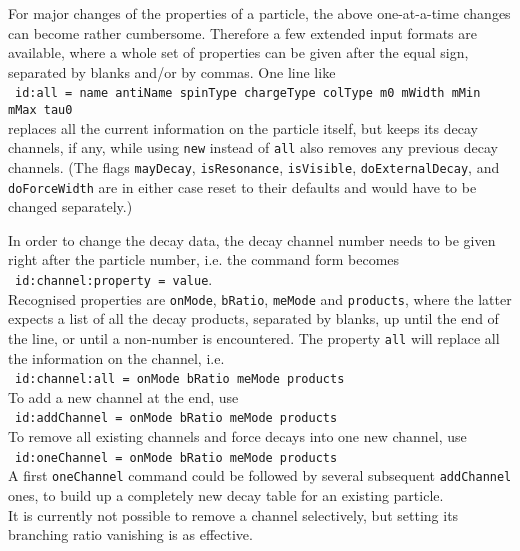 \documentclass{elsartmod}
\newcommand{\cindent}{\hspace*{10mm}~}
\begin{document}
For major changes of the properties of a particle, the above 
one-at-a-time changes can become rather cumbersome. Therefore 
a few extended input formats are available, where a whole
set of properties can be given after the equal sign, separated
by blanks and/or by commas. One line like\\ 
\cindent \texttt{id:all = name antiName spinType chargeType %
colType m0 mWidth mMin mMax tau0}\\
replaces all the current information on the particle itself, but 
keeps its decay channels, if any, while using \texttt{new} instead 
of \texttt{all} also removes any previous decay channels. (The 
flags \texttt{mayDecay}, \texttt{isResonance}, \texttt{isVisible}, 
\texttt{doExternalDecay}, and \texttt{doForceWidth} are in either 
case reset to their defaults and would have to be changed separately.) 

In order to change the decay data, the decay channel number needs
to be given right after the particle number, i.e. the command form
becomes\\
\cindent  \texttt{id:channel:property = value}.\\
Recognised properties are \texttt{onMode}, \texttt{bRatio}, 
\texttt{meMode} and \texttt{products}, where the latter expects a 
list of all the decay products, separated by blanks, up until the 
end of the line, or until a non-number is encountered.
The property \texttt{all} will replace all the information on the 
channel, i.e.\\
\cindent \texttt{id:channel:all = onMode bRatio meMode products }\\
To add a new channel at the end, use\\
\cindent \texttt{id:addChannel = onMode bRatio meMode products } \\
To remove all existing channels and force decays into one new channel,
use\\
\cindent \texttt{id:oneChannel = onMode bRatio meMode products } \\
A first \texttt{oneChannel} command could be followed by several 
subsequent \texttt{addChannel} ones, to build up a completely new decay 
table for an existing particle.\\ 
It is currently not possible to remove a channel selectively, but setting 
its branching ratio vanishing is as effective.
\end{document}
